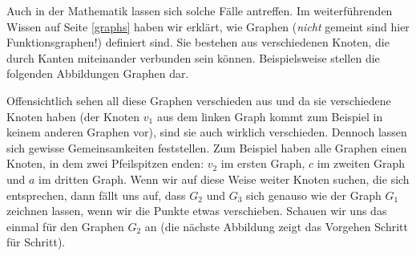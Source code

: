 \documentclass[../../main.tex]{subfiles}
\begin{document}
Auch in der Mathematik lassen sich solche Fälle antreffen. Im weiterführenden Wissen auf Seite \ref{graphs} haben wir 
erklärt, wie Graphen (\emph{nicht} gemeint sind hier Funktionsgraphen!) definiert sind. Sie bestehen aus verschiedenen 
Knoten, die durch Kanten miteinander verbunden sein können. Beispielsweise stellen die folgenden Abbildungen Graphen dar.
\begin{center}
\begin{multicols}{3}
\end{multicols}
\end{center}
Offensichtlich sehen all diese Graphen verschieden aus und da sie verschiedene Knoten haben (der Knoten $v_1$ aus dem 
linken Graph kommt zum Beispiel in keinem anderen Graphen vor), sind sie auch wirklich verschieden. Dennoch lassen sich 
gewisse Gemeinsamkeiten feststellen. Zum Beispiel haben alle Graphen einen Knoten, in dem zwei Pfeilspitzen enden: $v_2$
im ersten Graph, $c$ im zweiten Graph und $a$ im dritten Graph. Wenn wir auf diese Weise weiter Knoten suchen, die sich 
entsprechen, dann fällt uns auf, dass $G_2$ und $G_3$ sich genauso wie der Graph $G_1$ zeichnen lassen, wenn
wir die Punkte etwas verschieben. Schauen wir uns das einmal für den Graphen $G_2$ an (die nächste Abbildung zeigt 
das Vorgehen Schritt für Schritt).
\end{document}
